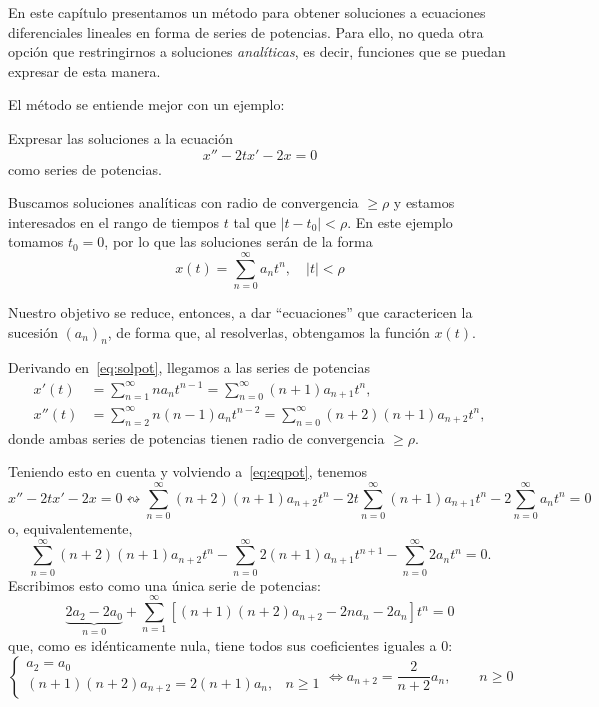 \documentclass[../ecuaciones_diferenciales.tex]{subfiles}
\begin{document}
En este capítulo presentamos un método para obtener soluciones a ecuaciones
diferenciales lineales en forma de series de potencias. Para ello, no queda otra
opción que restringirnos a soluciones \emph{analíticas}, es decir, funciones que
se puedan expresar de esta manera.

El método se entiende mejor con un ejemplo:

\begin{example}
	Expresar las soluciones a la ecuación
	\begin{equation} \label{eq:eqpot}
		x''-2tx'-2x=0
	\end{equation}
	como series de potencias.

	Buscamos soluciones analíticas con radio de convergencia \(\geq \rho\) y
	estamos interesados en el rango de tiempos \(t\) tal que \(|t-t_0| <
	\rho\). En este ejemplo tomamos \(t_0 = 0\), por lo que las soluciones serán
	de la forma
	\begin{equation}
		\label{eq:solpot}
		x(t) = \sum_{n=0}^\infty a_nt^n, \quad |t| < \rho
	\end{equation}

	Nuestro objetivo se reduce, entonces, a dar ``ecuaciones'' que caractericen la
	sucesión \((a_n)_n\), de forma que, al resolverlas, obtengamos la función \(x(t)\).

	Derivando en~\eqref{eq:solpot}, llegamos a las series de potencias
	\begin{align*}
		x'(t)  & = \sum_{n=1}^\infty na_nt^{n-1}
		= \sum_{n=0}^\infty (n+1)a_{n+1}t^n,          \\
		x''(t) & = \sum_{n=2}^\infty n(n-1)a_nt^{n-2}
		= \sum_{n=0}^\infty (n+2)(n+1)a_{n+2}t^n,
	\end{align*}
	donde ambas series de potencias tienen radio de convergencia \(\geq \rho\).

	Teniendo esto en cuenta y volviendo a~\eqref{eq:eqpot}, tenemos
	\[x''-2tx'-2x=0 \leftrightsquigarrow \sum_{n=0}^\infty (n+2)(n+1)a_{n+2}t^n -
		2t \sum_{n=0}^\infty (n+1)a_{n+1}t^n - 2 \sum_{n=0}^\infty a_nt^n = 0\]
	o, equivalentemente,
	\[\sum_{n=0}^\infty (n+2)(n+1)a_{n+2}t^n - \sum_{n=0}^\infty
		2(n+1)a_{n+1}t^{n+1} - \sum_{n=0}^\infty 2a_nt^n = 0.\]
	Escribimos esto como una única serie de potencias:
	\[\underbrace{2a_2-2a_0}_{n=0} +
		\sum_{n=1}^\infty[(n+1)(n+2)a_{n+2}-2na_n-2a_n]t^n = 0\]
	que, como es idénticamente nula, tiene todos sus coeficientes iguales a 0:
	\begin{equation}
		\label{eq:seqpot}
		\begin{cases}
			a_2 = a_0                                 \\
			(n+1)(n+2)a_{n+2} = 2(n+1)a_n, & n \geq 1
		\end{cases} \iff
		a_{n+2} = \frac{2}{n+2} a_n, \qquad n \geq 0
	\end{equation}


\end{example}
\end{document}
